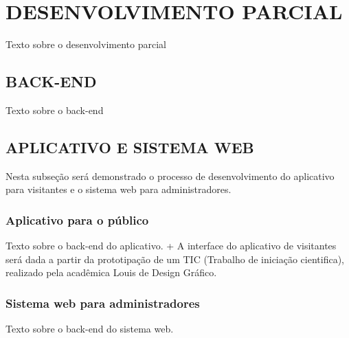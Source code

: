 \chapter{DESENVOLVIMENTO PARCIAL}
\label{cap:devParc}

Texto sobre o desenvolvimento parcial

\section{BACK-END}
\label{sec:premissas}

Texto sobre o back-end

\section{APLICATIVO E SISTEMA WEB}

Nesta subseção será demonstrado o processo de desenvolvimento do aplicativo para visitantes e o sistema web para administradores.

\subsection{Aplicativo para o público}

Texto sobre o back-end do aplicativo. + A interface do aplicativo de visitantes será dada a partir da prototipação de um TIC (Trabalho de iniciação cientifica), realizado pela acadêmica Louis de Design Gráfico.

\subsection{Sistema web para administradores}

Texto sobre o back-end do sistema web.